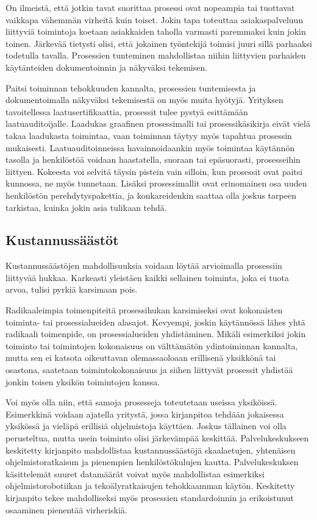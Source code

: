 \documentclass[
  finnish,
  letterpaper,
  DIV=11,
  numbers=noendperiod,
  oneside]{scrreprt}
\begin{document}
On ilmeistä, että jotkin tavat suorittaa prosessi ovat nopeampia tai
tuottavat vaikkapa vähemmän virheitä kuin toiset. Jokin tapa toteuttaa
asiakaspalveluun liittyviä toimintoja koetaan asiakkaiden taholla
varmasti paremmaksi kuin jokin toinen. Järkevää tietysti olisi, että
jokainen työntekijä toimisi juuri sillä parhaaksi todetulla tavalla.
Prosessien tunteminen mahdollistaa niihin liittyvien parhaiden
käytänteiden dokumentoinnin ja näkyväksi tekemisen.

Paitsi toiminnan tehokkuuden kannalta, prosessien tuntemisesta ja
dokumentoimalla näkyväksi tekemisestä on myös muita hyötyjä. Yrityksen
tavoitellessa laatusertifikaattia, prosessit tulee pystyä esittämään
laatuauditoijalle. Laadukas graafinen prosessimalli tai
prosessikäsikirja eivät vielä takaa laadukasta toimintaa, vaan toiminnan
täytyy myös tapahtua prosessin mukaisesti. Laatuauditoinneissa
havainnoidaankin myös toimintaa käytännön tasolla ja henkilöstöä voidaan
haastatella, suoraan tai epäsuorasti, prosesseihin liittyen. Kokeesta
voi selvitä täysin pistein vain silloin, kun prosessit ovat paitsi
kunnossa, ne myös tunnetaan. Lisäksi prosessimallit ovat erinomainen osa
uuden henkilöstön perehdytyspakettia, ja konkareidenkin saattaa olla
joskus tarpeen tarkistaa, kuinka jokin asia tulikaan tehdä.

\subsection{Kustannussäästöt}\label{kustannussuxe4uxe4stuxf6t}

Kustannussäästöjen mahdollisuuksia voidaan löytää arvioimalla prosessiin
liittyvää hukkaa. Karkeasti yleistäen kaikki sellainen toiminta, joka ei
tuota arvoa, tulisi pyrkiä karsimaan pois.

Radikaaleimpia toimenpiteitä prosessihukan karsimiseksi ovat kokonaisten
toiminta- tai prosessialueiden alasajot. Kevyempi, joskin käytännössä
lähes yhtä radikaali toimenpide, on prosessialueiden yhdistäminen.
Mikäli esimerkiksi jokin toiminto tai toimintojen kokonaisuus on
välttämätön ydintoiminnan kannalta, mutta sen ei katsota oikeuttavan
olemassaoloaan erillisenä yksikkönä tai osastona, saatetaan
toimintokokonaisuus ja siihen liittyvät prosessit yhdistää jonkin toisen
yksikön toimintojen kanssa.

Voi myös olla niin, että samoja prosesseja toteutetaan useissa
yksiköissä. Esimerkkinä voidaan ajatella yritystä, jossa kirjanpitoa
tehdään jokaisessa yksikössä ja vieläpä erillisiä ohjelmistoja käyttäen.
Joskus tällainen voi olla perusteltua, mutta usein toiminto olisi
järkevämpää keskittää. Palvelukeskukseen keskitetty kirjanpito
mahdollistaa kustannussäästöjä skaalaetujen, yhtenäisen
ohjelmistoratkaisun ja pienempien henkilöstökulujen kautta.
Palvelukeskuksen käsittelemät suuret datamäärät voivat myös mahdollistaa
esimerkiksi ohjelmistorobotiikan ja tekoälyratkaisujen tehokkaamman
käytön. Keskitetty kirjanpito tekee mahdolliseksi myös prosessien
standardoinnin ja erikoistunut osaaminen pienentää virheriskiä.
\end{document}
